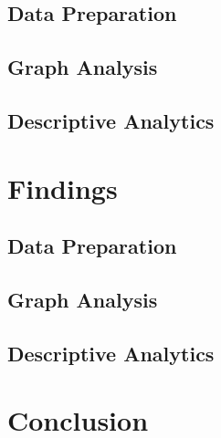 \documentclass[conference]{IEEEtran}
\begin{document}
\subsection{Data Preparation}


\subsection{Graph Analysis}


\subsection{Descriptive Analytics}


\section{Findings}

\subsection{Data Preparation}


\subsection{Graph Analysis}


\subsection{Descriptive Analytics}


\section{Conclusion}



\end{document}

